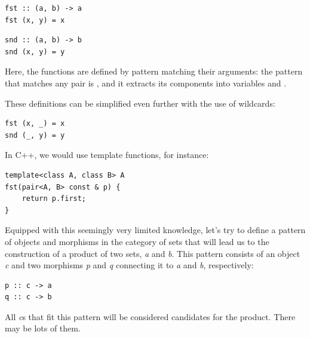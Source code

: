 \begin{Verbatim}[commandchars=\\\{\}]
fst :: (a, b) -> a
fst (x, y) = x
\end{Verbatim}

\begin{Verbatim}[commandchars=\\\{\}]
snd :: (a, b) -> b
snd (x, y) = y
\end{Verbatim}
Here, the functions are defined by pattern matching their arguments: the
pattern that matches any pair is , and it extracts its
components into variables  and .

These definitions can be simplified even further with the use of
wildcards:

\begin{Verbatim}[commandchars=\\\{\}]
fst (x, _) = x
snd (_, y) = y
\end{Verbatim}
In C++, we would use template functions, for instance:

\begin{Verbatim}
template<class A, class B> A
fst(pair<A, B> const & p) {
    return p.first;
}
\end{Verbatim}
Equipped with this seemingly very limited knowledge, let's try to define
a pattern of objects and morphisms in the category of sets that will
lead us to the construction of a product of two sets, \emph{a} and
\emph{b}. This pattern consists of an object \emph{c} and two morphisms
\emph{p} and \emph{q} connecting it to \emph{a} and \emph{b},
respectively:

\begin{Verbatim}[commandchars=\\\{\}]
p :: c -> a
q :: c -> b
\end{Verbatim}

\begin{figure}[H]
\centering
{}
\end{figure}

\noindent
All \emph{c}s that fit this pattern will be considered candidates for
the product. There may be lots of them.

